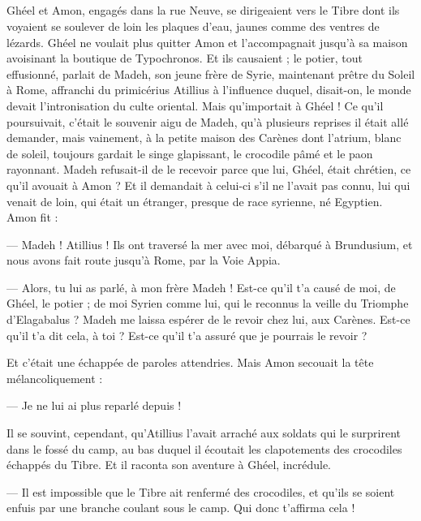 \documentclass[a4paper, 11pt, oneside, polutonikogreek, french]{article}
\begin{document}
\subsection{}
\paragraph{}
Ghéel et Amon, engagés dans la rue Neuve, se dirigeaient vers le Tibre dont ils voyaient se soulever de loin les plaques d'eau, jaunes comme des ventres de lézards. Ghéel ne voulait plus quitter Amon et l'accompagnait jusqu'à sa maison avoisinant la boutique de Typochronos. Et ils causaient ; le potier, tout effusionné, parlait de Madeh, son jeune frère de Syrie, maintenant prêtre du Soleil à Rome, affranchi du primicérius Atillius à l'influence duquel, disait-on, le monde devait l'intronisation du culte oriental. Mais qu'importait à Ghéel ! Ce qu'il poursuivait, c'était le souvenir aigu de Madeh, qu'à plusieurs reprises il était allé demander, mais vainement, à la petite maison des Carènes dont l'atrium, blanc de soleil, toujours gardait le singe glapissant, le crocodile pâmé et le paon rayonnant. Madeh refusait-il de le recevoir parce que lui, Ghéel, était chrétien, ce qu'il avouait à Amon ? Et il demandait à celui-ci s'il ne l'avait pas connu, lui qui venait de loin, qui était un étranger, presque de race syrienne, né Egyptien. Amon fit :

--- Madeh ! Atillius ! Ils ont traversé la mer avec moi, débarqué à Brundusium, et nous avons fait route jusqu'à Rome, par la Voie Appia.

--- Alors, tu lui as parlé, à mon frère Madeh ! Est-ce qu'il t'a causé de moi, de Ghéel, le potier ; de moi Syrien comme lui, qui le reconnus la veille du Triomphe d'Elagabalus ? Madeh me laissa espérer de le revoir chez lui, aux Carènes. Est-ce qu'il t'a dit cela, à toi ? Est-ce qu'il t'a assuré que je pourrais le revoir ?

Et c'était une échappée de paroles attendries. Mais Amon secouait la tête mélancoliquement :

--- Je ne lui ai plus reparlé depuis !

Il se souvint, cependant, qu'Atillius l'avait arraché aux soldats qui le surprirent dans le fossé du camp, au bas duquel il écoutait les clapotements des crocodiles échappés du Tibre. Et il raconta son aventure à Ghéel, incrédule.

--- Il est impossible que le Tibre ait renfermé des crocodiles, et qu'ils se soient enfuis par une branche coulant sous le camp. Qui donc t'affirma cela !
\end{document}
